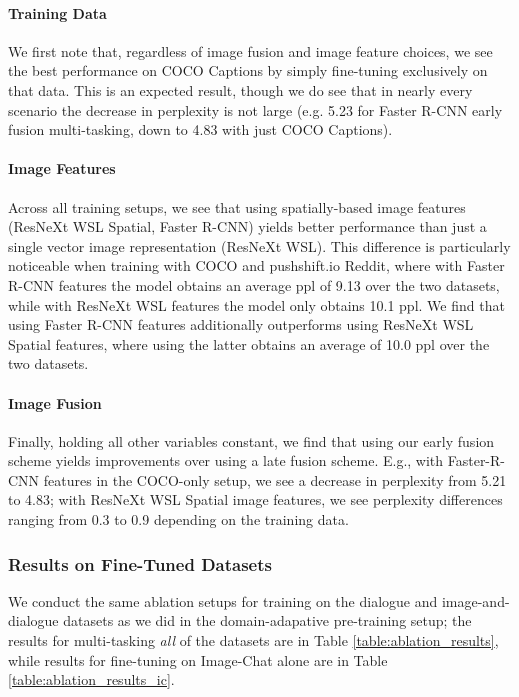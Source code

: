 \documentclass[11pt,a4paper]{article}
\begin{document}
\paragraph{Training Data} We first note that, regardless of image fusion and image feature choices, we see the best performance on COCO Captions by simply fine-tuning exclusively on that data. This is an expected result, though we do see that in nearly every scenario the decrease in perplexity is not large (e.g. 5.23 for Faster R-CNN early fusion multi-tasking, down to 4.83 with just COCO Captions).

\paragraph{Image Features} Across all training setups, we see that using spatially-based image features (ResNeXt WSL Spatial, Faster R-CNN) yields better performance than just a single vector image representation (ResNeXt WSL). This difference is particularly noticeable when training with COCO and pushshift.io Reddit, where with Faster R-CNN features the model obtains an average ppl of 9.13 over the two datasets, while with ResNeXt WSL features the model only obtains 10.1 ppl. We find that using Faster R-CNN features additionally outperforms using ResNeXt WSL Spatial features, where using the latter obtains an average of 10.0 ppl over the two datasets.

\paragraph{Image Fusion} Finally, holding all other variables constant, we find that using our early fusion scheme yields improvements over using a late fusion scheme. E.g., with Faster-R-CNN features in the COCO-only setup, we see a decrease in perplexity from 5.21 to 4.83; with ResNeXt WSL Spatial image features, we see perplexity differences ranging from 0.3 to 0.9 depending on the training data.

\subsubsection{Results on Fine-Tuned Datasets}
We conduct the same ablation setups for training on the dialogue and image-and-dialogue datasets as we did in the domain-adapative pre-training setup; the results for multi-tasking \textit{all} of the datasets are in Table \ref{table:ablation_results}, while results for fine-tuning on Image-Chat alone are in Table \ref{table:ablation_results_ic}.
\end{document}
